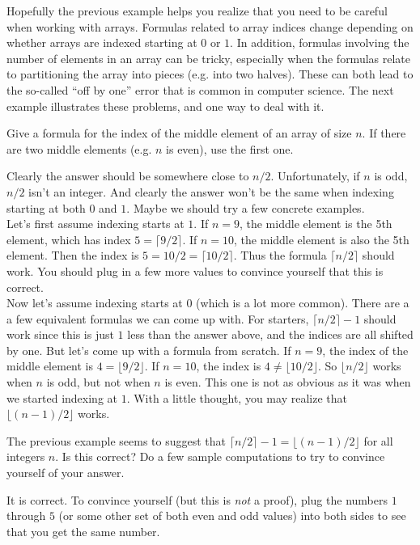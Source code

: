 Hopefully the previous example helps you realize that you need to be careful when working with arrays.
Formulas related to array indices change depending on whether arrays are indexed starting at $0$ or $1$.
In addition, formulas involving the number of elements in an array can be tricky, especially when the
formulas relate to partitioning the array into pieces (e.g. into two halves).
These can both lead to the so-called ``off by one'' error that is common in computer science.
The next example illustrates these problems, and one way to deal with it.


\begin{exa}
Give a formula for the index of the middle element of an array of size $n$.
If there are two middle elements (e.g. $n$ is even), use the first one.
\begin{sol}
Clearly the answer should be somewhere close to $n/2$.  Unfortunately, if $n$ is odd,
$n/2$ isn't an integer.  
And clearly the answer won't be the same when indexing starting at both $0$ and $1$.
 Maybe we should try a few concrete examples.\\

Let's first assume indexing starts at $1$.   
If $n=9$, the middle element is the 5th element, which has index $5 = \lceil 9/2\rceil$.  
If $n=10$, the middle element is also the 5th element.
Then the index is $5 = 10/2 =\lceil 10/2\rceil$.
Thus the formula $\lceil n/2\rceil$ should work.
You should plug in a few more values to convince yourself that this is correct.\\

Now let's assume indexing starts at $0$ (which is a lot more common).
There are a a few equivalent formulas we can come up with.
For starters, $\lceil n/2\rceil -1$ should work since this is just $1$ less 
than the answer above, and the indices are all shifted by one.
But let's come up with a formula from scratch.
If $n=9$, the index of the middle element is $4 = \lfloor 9/2\rfloor$.  
If $n=10$, the index is $4\neq \lfloor 10/2\rfloor$.  
So $\lfloor n/2\rfloor$ works when $n$ is odd, but not when $n$ is even.
This one is not as obvious as it was when we started indexing at $1$. 
With a little thought, you may realize that $\lfloor (n-1)/2\rfloor$ works.

\end{sol}
\end{exa}

\begin{ques}
The previous example seems to suggest that $\lceil n/2\rceil -1=\lfloor (n-1)/2\rfloor$
for all integers $n$.  Is this correct?  Do a few sample computations to try to convince
yourself of your answer.\\
\answerlinetwo
\begin{answer}
It is correct.  To convince yourself (but this is {\em not} a proof), 
plug the numbers $1$ through $5$ (or some other set of both even and odd values) into both sides
to see that you get the same number.
\end{answer}
\end{ques}

